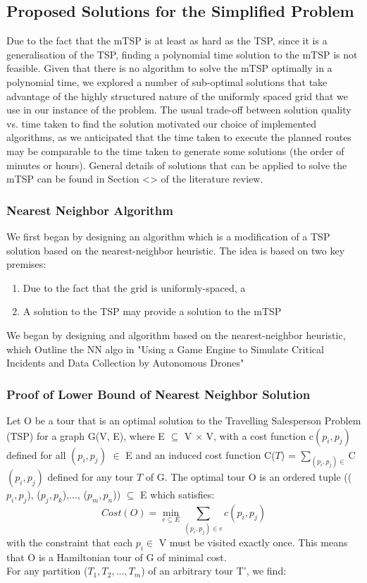 \subsection{Proposed Solutions for the Simplified Problem}
Due to the fact that the mTSP is at least as hard as the TSP, since it is a generalisation of the TSP, finding a polynomial time solution to the mTSP is not feasible. Given that there is no algorithm to solve the mTSP optimally in a polynomial time, we explored a number of sub-optimal solutions that take advantage of the highly structured nature of the uniformly spaced grid that we use in our instance of the problem. The usual trade-off between solution quality vs. time taken to find the solution motivated our choice of implemented algorithms, as we anticipated that the time taken to execute the planned routes may be comparable to the time taken to generate some solutions (the order of minutes or hours).  General details of solutions that can be applied to solve the mTSP can be found in Section <> of the literature review.

\subsubsection{Nearest Neighbor Algorithm}
We first began by designing an algorithm which is a modification of a TSP solution based on the nearest-neighbor heuristic. The idea is based on two key premises:
\begin{enumerate}
    \item Due to the fact that the grid is uniformly-spaced, a 
    \item A solution to the TSP may provide a solution to the mTSP 
\end{enumerate}


We began by designing and algorithm based on the nearest-neighbor heuristic, which 
Outline the NN algo in "Using a Game Engine to Simulate Critical Incidents
and Data Collection by Autonomous Drones"

\subsubsection{Proof of Lower Bound of Nearest Neighbor Solution}
Let O be a tour that is an optimal solution to the Travelling Salesperson Problem (TSP) for  a graph G(V, E), where E $\subseteq$ V $\times$ V, with a cost function c$(p_i, p_j)$ defined for all $(p_i, p_j)$ $\in$ E and an induced cost function 
C($T$) = $\sum\limits_{(p_i, p_j)\in }$C$(p_i, p_j)$ defined for any tour $T$ of G.
The optimal tour O is an ordered tuple (($p_i, p_j$), ($p_j, p_k$),..., ($p_m, p_n$)) $\subseteq$ E which satisfies:
\[
Cost(O) =  \min_{e \subseteq E}\sum_{(p_i, p_j) \in e} c(p_i, p_j) 
\]
with the constraint that each $p_i \in$ V must be visited exactly once. This means that O is a Hamiltonian tour of G of minimal cost. 
\\
For any partition ($T_1, T_2, ..., T_m$) of an arbitrary tour T', we find:


